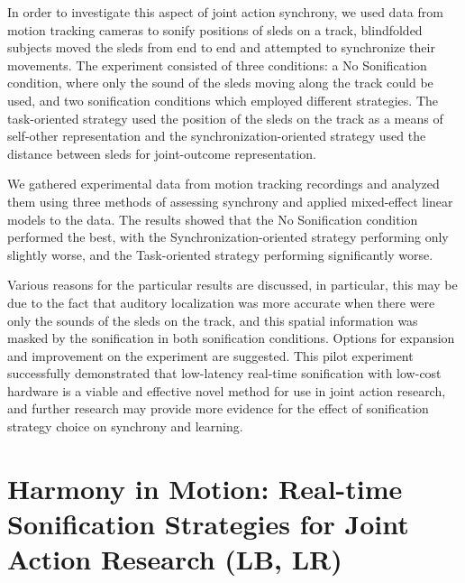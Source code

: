 \documentclass[10pt,a4paper,onecolumn]{article}
\begin{document}
In order to investigate this aspect of joint action synchrony, we used data from motion tracking cameras to sonify positions of sleds on a track, blindfolded subjects moved the sleds from end to end and attempted to synchronize their movements. The experiment consisted of three conditions: a No Sonification condition, where only the sound of the sleds moving along the track could be used, and two sonification conditions which employed different strategies. The task-oriented strategy used the position of the sleds on the track as a means of self-other representation and the synchronization-oriented strategy used the distance between sleds for joint-outcome representation.

We gathered experimental data from motion tracking recordings and analyzed them using three methods of assessing synchrony and applied mixed-effect linear models to the data. The results showed that the No Sonification condition performed the best, with the Synchronization-oriented strategy performing only slightly worse, and the Task-oriented strategy performing significantly worse.

Various reasons for the particular results are discussed, in particular, this may be due to the fact that auditory localization was more accurate when there were only the sounds of the sleds on the track, and this spatial information was masked by the sonification in both sonification conditions. Options for expansion and improvement on the experiment are suggested. This pilot experiment successfully demonstrated that low-latency real-time sonification with low-cost hardware is a viable and effective novel method for use in joint action research, and further research may provide more evidence for the effect of sonification strategy choice on synchrony and learning.
\clearpage
\twocolumn
{
\hypersetup{linkcolor=Black}
\setcounter{tocdepth}{3}
\tableofcontents
}
\clearpage
\hypertarget{harmony-in-motion-real-time-sonification-strategies-for-joint-action-research-lb-lr}{%
\section{Harmony in Motion: Real-time Sonification Strategies for Joint Action Research (LB, LR)}\label{harmony-in-motion-real-time-sonification-strategies-for-joint-action-research-lb-lr}}
\end{document}
